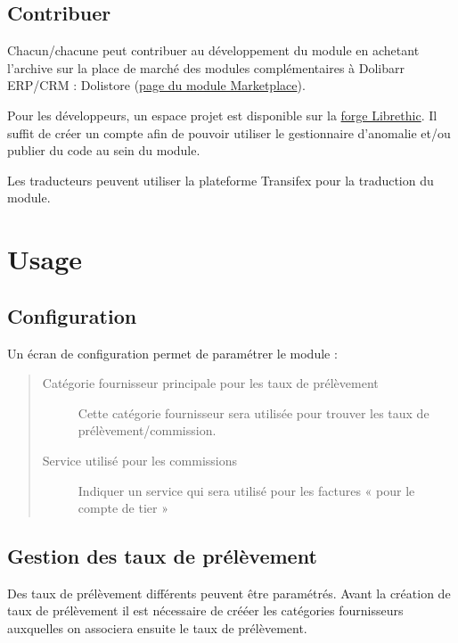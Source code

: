 \documentclass[letterpaper,10pt,english]{sphinxmanual}
\begin{document}
\section{Contribuer}
\label{\detokenize{intro:contribuer}}
Chacun/chacune peut contribuer au développement du module en achetant l'archive sur la place de marché des modules complémentaires à Dolibarr ERP/CRM : Dolistore (\href{https://www.dolistore.com/en/modules/xxx.html}{page du module Marketplace}).

Pour les développeurs, un espace projet est disponible sur la \href{https://code.librethic.io}{forge Librethic}. Il suffit de créer un compte afin de pouvoir utiliser le gestionnaire d'anomalie et/ou publier du code au sein du module.

Les traducteurs peuvent utiliser la plateforme Transifex pour la traduction du module.


\chapter{Usage}
\label{\detokenize{usage:usage}}\label{\detokenize{usage::doc}}

\section{Configuration}
\label{\detokenize{usage:configuration}}
Un écran de configuration permet de paramétrer le module :
\begin{quote}
\begin{description}
\item[{Catégorie fournisseur principale pour les taux de prélèvement}] \leavevmode
Cette catégorie fournisseur sera utilisée pour trouver les taux de prélèvement/commission.

\item[{Service utilisé pour les commissions}] \leavevmode
Indiquer un service qui sera utilisé pour les factures « pour le compte de tier »

\end{description}
\end{quote}


\section{Gestion des taux de prélèvement}
\label{\detokenize{usage:gestion-des-taux-de-prelevement}}
Des taux de prélèvement différents peuvent être paramétrés. Avant la création de taux de prélèvement il est nécessaire de crééer les catégories fournisseurs auxquelles on associera ensuite le taux de prélèvement.
\end{document}
